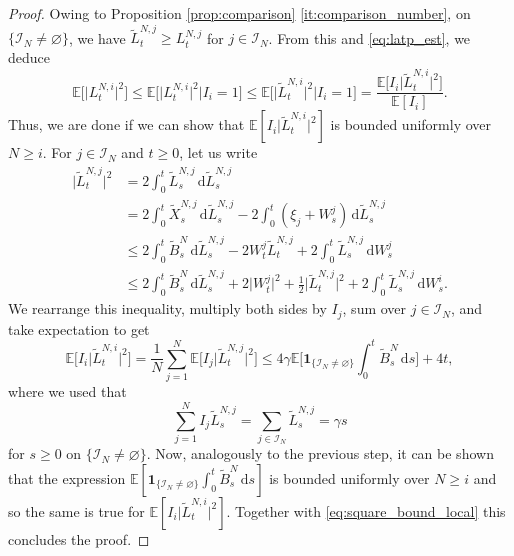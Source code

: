 \documentclass[11pt, a4paper]{article}
\theoremstyle{plain}
\theoremstyle{definition}
\theoremstyle{remark}
\numberwithin{equation}{section}
\newcommand{\ev}{\mathbb{E}}
\renewcommand{\d}{\mathrm{d}}
\renewcommand{\bf}[1]{\mathbf{#1}}
\renewcommand{\cal}[1]{\mathcal{#1}}
\begin{document}
\begin{proof}
Owing to Proposition \ref{prop:comparison} \ref{it:comparison_number}, on $\{\cal{I}_N \neq \varnothing\}$, we have $\tilde{L}^{N, j}_t \geq L^{N, j}_t$ for $j \in \cal{I}_N$. From this and \eqref{eq:latp_est}, we deduce
\begin{equation} \label{eq:square_bound_local}
      \ev\bigl[\lvert L^{N, i}_t\rvert^2\bigr] \leq \ev\bigl[\lvert L^{N, i}_t\rvert^2 \big\vert I_i = 1\bigr] \leq \ev\bigl[\lvert\tilde{L}^{N, i}_t\rvert^2 \big\rvert I_i = 1\bigr] = \frac{\ev\bigl[I_i \lvert\tilde{L}^{N, i}_t\rvert^2\bigr]}{\ev[I_i]}.
\end{equation}
Thus, we are done if we can show that $\ev[I_i \lvert\tilde{L}^{N, i}_t\rvert^2]$ is bounded uniformly over $N \geq i$. For $j \in \cal{I}_N$ and $t \geq 0$, let us write
\begin{align*}
    \lvert \tilde{L}^{N, j}_t\rvert^2 &= 2 \int_0^t \tilde{L}^{N, j}_s \, \d \tilde{L}^{N, j}_s \\
    &= 2 \int_0^t \tilde{X}^{N, j}_s \, \d \tilde{L}^{N, j}_s - 2 \int_0^t (\xi_j + W^j_s) \, \d \tilde{L}^{N, j}_s \\
    &\leq 2 \int_0^t \tilde{B}^N_s \, \d \tilde{L}^{N, j}_s - 2 W^j_t \tilde{L}^{N, j}_t + 2\int_0^t \tilde{L}^{N, j}_s \, \d W^j_s \\
    &\leq 2 \int_0^t \tilde{B}^N_s \, \d \tilde{L}^{N, j}_s + 2 \lvert W^j_t\rvert^2 + \frac{1}{2} \lvert \tilde{L}^{N, j}_t\rvert^2 + 2\int_0^t \tilde{L}^{N, j}_s \, \d W^i_s.
\end{align*}
We rearrange this inequality, multiply both sides by $I_j$, sum over $j \in \cal{I}_N$, and take expectation to get
\begin{equation*}
    \ev\bigl[I_i \lvert \tilde{L}^{N, i}_t\rvert^2\bigr] = \frac{1}{N} \sum_{j = 1}^N \ev\bigl[I_j \lvert \tilde{L}^{N, j}_t\rvert^2\bigr]
    \leq 4 \gamma \ev\biggl[\bf{1}_{\{\cal{I}_N \neq \varnothing\}}\int_0^t \tilde{B}^N_s \, \d s\biggr] + 4 t,
\end{equation*}
where we used that 
\begin{equation*}
    \sum_{j = 1}^N I_j \tilde{L}^{N, j}_s = \sum_{j \in \cal{I}_N} \tilde{L}^{N, j}_s = \gamma s
\end{equation*}
for $s \geq 0$ on $\{\cal{I}_N \neq \varnothing\}$. Now, analogously to the previous step, it can be shown that the expression $\ev[\bf{1}_{\{\cal{I}_N \neq \varnothing\}} \int_0^t \tilde{B}^N_s \, \d s]$ is bounded uniformly over $N \geq i$ and so the same is true for $\ev[I_i \lvert \tilde{L}^{N, i}_t\rvert^2]$. Together with \eqref{eq:square_bound_local} this concludes the proof.
\end{proof}
\end{document}
